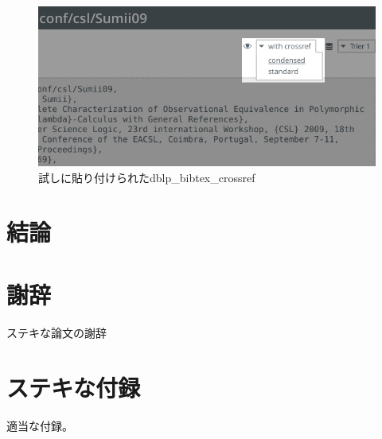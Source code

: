 \documentclass[uplatex]{sumiilab-paper}
\theoremstyle{mystyle}
\numberwithin{definition}{chapter} %
\begin{document}
\begin{figure}[t]
  \centering
  \includegraphics[width=.98\linewidth]{../docs/dblp_bibtex_crossref.png}
\caption{試しに貼り付けられたdblp\_bibtex\_crossref}
\label{f:aaa}
\end{figure}

\chapter{結論}


\backmatter%
\chapter{謝辞}

ステキな論文の謝辞




\appendix%
\chapter{ステキな付録}
適当な付録。
\end{document}
